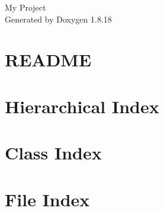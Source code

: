 \let\mypdfximage\pdfximage\def\pdfximage{\immediate\mypdfximage}\documentclass[twoside]{book}
\newcommand{\+}{\discretionary{\mbox{\scriptsize$\hookleftarrow$}}{}{}}
\newcommand{\clearemptydoublepage}{%
  \newpage{\pagestyle{empty}\cleardoublepage}%
}
\begin{document}
\hypersetup{pageanchor=false,
             bookmarksnumbered=true,
             pdfencoding=unicode
            }
\begin{titlepage}
\vspace*{7cm}
\begin{center}%
{\Large My Project }\\
\vspace*{1cm}
{\large Generated by Doxygen 1.8.18}\\
\end{center}
\end{titlepage}
\clearemptydoublepage
{}
\tableofcontents
\clearemptydoublepage
{}
\hypersetup{pageanchor=true}

\chapter{R\+E\+A\+D\+ME}
\label{md__home_mirmik_project_igris_igris_trent_README}

\chapter{Hierarchical Index}

\chapter{Class Index}

\chapter{File Index}

\end{document}
